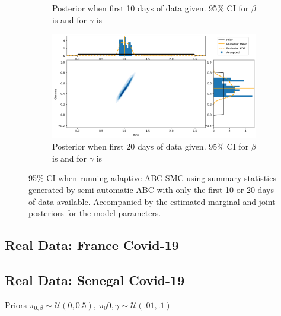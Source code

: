 \documentclass[11pt,a4paper]{article}
\theoremstyle{break}
\begin{document}
\begin{figure}[H]
{\begin{subfigure}{.45\paperwidth}
        \caption{Posterior when first 10 days of data given. 95\% CI for $\beta$ is \text{[0.842,1.160]} and for $\gamma$ is \text{[0.305,0.705]}}
        \label{fig_semi_auto_10_days_posterior}
      \end{subfigure}
      \begin{subfigure}{.45\paperwidth}
        \centering
        \includegraphics[width=1\textwidth]{Semi_Auto_ABC_SMC_20_days_joint_posterior.png}
        \caption{Posterior when first 20 days of data given. 95\% CI for $\beta$ is \text{[0.891,1.164]} and for $\gamma$ is \text{[0.340,0.603]}}
        \label{fig_semi_auto_20_days_posterior}
      \end{subfigure}
    }
    \caption{95\% CI when running adaptive ABC-SMC using summary statistics generated by semi-automatic ABC with only the first 10 or 20 days of data available. Accompanied by the estimated marginal and joint posteriors for the model parameters.}
    \label{fig_semi_auto_restricted_data}
  \end{figure}

\subsection{Real Data: France Covid-19}\label{sec_real_data}


\subsection{Real Data: Senegal Covid-19}\label{sec_real_data}


  \par Priors $\pi_{0,\beta}\sim\mathcal{U}(0,0.5),\ \pi_0{0,\gamma}\sim\mathcal{U}(.01,.1)$
\end{document}
